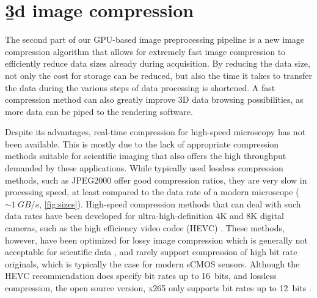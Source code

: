   
\section{\b3d image compression}

  The second part of our GPU-based image preprocessing pipeline is a new image compression algorithm that allows for extremely fast image compression to efficiently reduce data sizes already during acquisition.
  By reducing the data size, not only the cost for storage can be reduced, but also the time it takes to transfer the data during the various steps of data processing is shortened. A fast compression method can also greatly improve 3D data browsing possibilities, as more data can be piped to the rendering software.

  Despite its advantages, real-time compression for high-speed microscopy has not been available. This is mostly due to the lack of appropriate compression methods suitable for scientific imaging that also offers the high throughput demanded by these applications. While typically used lossless compression methods, such as JPEG2000 \cite{adams_jpeg-2000_2001} offer good compression ratios, they are very slow in processing speed, at least compared to the data rate of a modern microscope ($\sim \SI{1}{GB/s}$, \autoref{fig:sizes}). High-speed compression methods that can deal with such data rates have been developed for ultra-high-definition 4K and 8K digital cameras, such as the high efficiency video codec (HEVC) \cite{international_telecommunications_union_h.265_2016}. These methods, however, have been optimized for lossy image compression which is generally not acceptable for scientific data \cite{cromey_digital_2013}, and rarely support compression of high bit rate originals, which is typically the case for modern sCMOS sensors. Although the HEVC recommendation does specify bit rates up to \SI{16}{bits}, and lossless compression, the open source version, x265 only supports bit rates up to \SI{12}{bits} \cite{noauthor_x265_nodate}.

